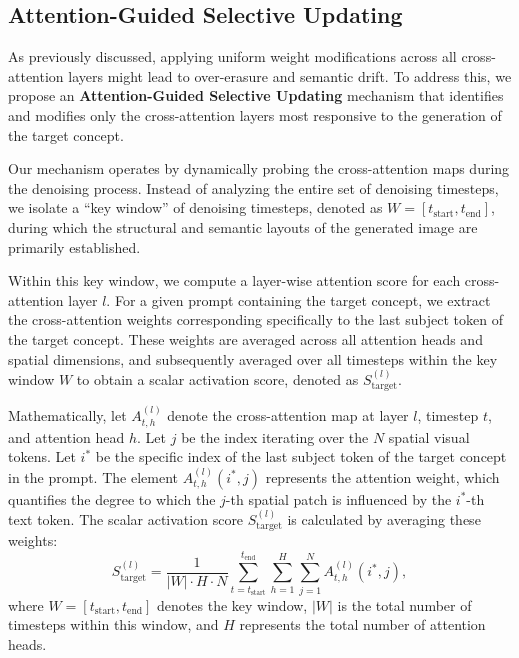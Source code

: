 \documentclass[letterpaper]{article} %
\begin{document}
\subsection{Attention-Guided Selective Updating}

As previously discussed, applying uniform weight modifications across all cross-attention layers might lead to over-erasure and semantic drift. To address this, we propose an \textbf{Attention-Guided Selective Updating} mechanism that identifies and modifies only the cross-attention layers most responsive to the generation of the target concept.

Our mechanism operates by dynamically probing the cross-attention maps during the denoising process. Instead of analyzing the entire set of denoising timesteps, we isolate a ``key window'' of denoising timesteps, denoted as $W=[t_{\text{start}}, t_{\text{end}}]$, during which the structural and semantic layouts of the generated image are primarily established.

Within this key window, we compute a layer-wise attention score for each cross-attention layer $l$. For a given prompt containing the target concept, we extract the cross-attention weights corresponding specifically to the last subject token of the target concept. These weights are averaged across all attention heads and spatial dimensions, and subsequently averaged over all timesteps within the key window $W$ to obtain a scalar activation score, denoted as $S_{\text{target}}^{(l)}$.

Mathematically, let $A_{t,h}^{(l)}$ denote the cross-attention map at layer $l$, timestep $t$, and attention head $h$. Let $j$ be the index iterating over the $N$ spatial visual tokens. Let $i^*$ be the specific index of the last subject token of the target concept in the prompt. The element $A_{t,h}^{(l)}(i^*, j)$ represents the attention weight, which quantifies the degree to which the $j$-th spatial patch is influenced by the $i^*$-th text token. The scalar activation score $S_{\text{target}}^{(l)}$ is calculated by averaging these weights:
\begin{equation}
    S_{\text{target}}^{(l)} = \frac{1}{|W| \cdot H \cdot N} \sum_{t = t_{\text{start}}}^{t_{\text{end}}} \sum_{h=1}^{H} \sum_{j=1}^{N} A_{t,h}^{(l)}(i^*, j) ,
\end{equation}
where $W = [t_{\text{start}}, t_{\text{end}}]$ denotes the key window, $|W|$ is the total number of timesteps within this window, and $H$ represents the total number of attention heads.
\end{document}
